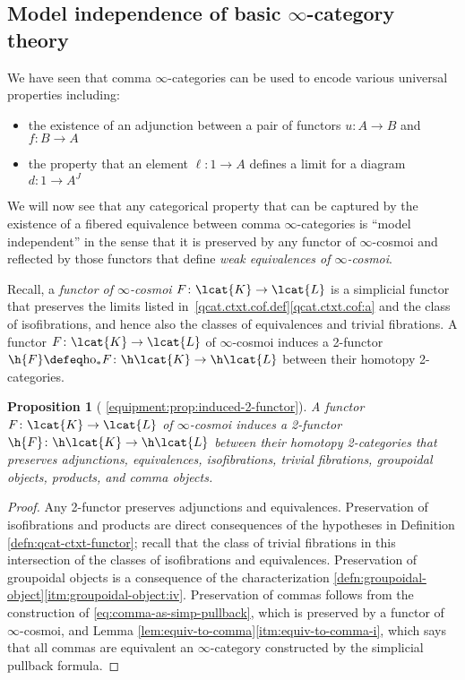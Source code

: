 \documentclass[12pt,reqno]{amsart}
\theoremstyle{plain}
\newtheorem{prop}[thm]{Proposition}
\theoremstyle{definition}
\theoremstyle{remark}
\numberwithin{equation}{subsection}
\renewcommand{\ho}{\mathrm{ho}}
\newcommand{\extRef}[3]{%
  {\protect\IfBeginWith{#3}{itm:}{}{#2.}}\ref*{#1:#3}}
\newcommand{\refV}{\extRef{equipment}{V}}
\begin{document}
\subsection{Model independence of basic \texorpdfstring{$\infty$}{infinity}-category theory}

We have seen that comma $\infty$-categories can be used to encode various universal properties including:
\begin{itemize}
\item the existence of an adjunction between a pair of functors $u \colon A \to B$ and $f \colon B \to A$
\item the property that an element $\ell \colon 1 \to A$ defines a limit for a diagram $d \colon 1 \to A^J$
\end{itemize}
We will now see that any categorical property that can be captured by the existence of a fibered equivalence between comma $\infty$-categories is ``model independent'' in the sense that it is preserved by any functor of $\infty$-cosmoi and reflected by those functors that define \emph{weak equivalences of $\infty$-cosmoi}.

Recall, a \emph{functor of $\infty$-cosmoi} $F \colon \lcat{K} \to \lcat{L}$ is a simplicial functor that preserves the limits listed  in~\ref{qcat.ctxt.cof.def}\ref{qcat.ctxt.cof:a} and the class of isofibrations, and hence also the classes of equivalences and  trivial fibrations.  A functor $F \colon \lcat{K} \to \lcat{L}$ of $\infty$-cosmoi induces a 2-functor $\h{F} \defeq \ho_*F \colon \h\lcat{K} \to \h\lcat{L}$ between their homotopy 2-categories.


\begin{prop}[{\refV{prop:induced-2-functor}}]\label{prop:induced-2-functor} A functor $F \colon \lcat{K} \to \lcat{L}$ of $\infty$-cosmoi induces a 2-functor $\h{F} \colon \h\lcat{K} \to \h\lcat{L}$ between their homotopy 2-categories that preserves  adjunctions, equivalences, isofibrations, trivial fibrations, groupoidal objects, products, and comma objects.
\end{prop}
\begin{proof}
Any 2-functor preserves  adjunctions and equivalences. Preservation of isofibrations and products  are direct consequences of the hypotheses in Definition \ref{defn:qcat-ctxt-functor}; recall that the class of trivial fibrations in this intersection of the classes of isofibrations and equivalences. Preservation of groupoidal objects is a consequence of the characterization  \ref{defn:groupoidal-object}\ref{itm:groupoidal-object:iv}. Preservation of commas follows from the construction of \eqref{eq:comma-as-simp-pullback}, which is preserved by a functor of $\infty$-cosmoi, and Lemma \ref{lem:equiv-to-comma}\ref{itm:equiv-to-comma-i}, which says that all commas are equivalent an $\infty$-category constructed by the simplicial pullback formula.
\end{proof}
\end{document}
